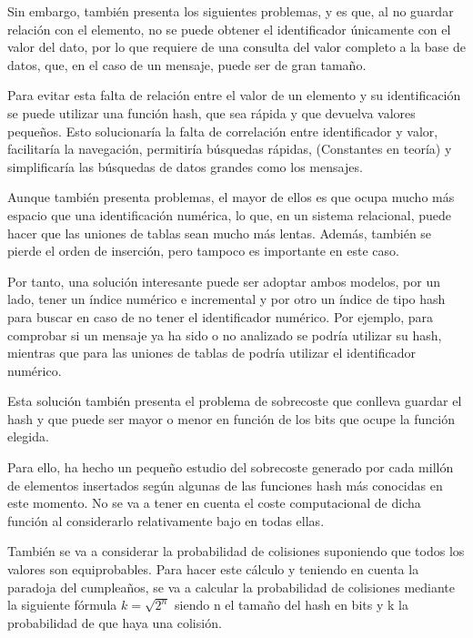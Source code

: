Sin embargo, también presenta los siguientes problemas, y es que, al no guardar relación con el elemento, no se puede obtener el identificador únicamente con el valor del dato, por lo que requiere de una consulta del valor completo a la base de datos, que, en el caso de un mensaje, puede ser de gran tamaño.

Para evitar esta falta de relación entre el valor de un elemento y su identificación se puede utilizar una función hash, que sea rápida y que devuelva valores pequeños. Esto solucionaría la falta de correlación entre identificador y valor, facilitaría la navegación, permitiría búsquedas rápidas, (Constantes en teoría) y simplificaría las búsquedas de datos grandes como los mensajes.

Aunque también presenta problemas, el mayor de ellos es que ocupa mucho más espacio que una identificación numérica, lo que, en un sistema relacional, puede hacer que las uniones de tablas sean mucho más lentas. Además, también se pierde el orden de inserción, pero tampoco es importante en este caso.

Por tanto, una solución interesante puede ser adoptar ambos modelos, por un lado, tener un índice numérico e incremental y por otro un índice de tipo hash para buscar en caso de no tener el identificador numérico. Por ejemplo, para comprobar si un mensaje ya ha sido o no analizado se podría utilizar su hash, mientras que para las uniones de tablas de podría utilizar el identificador numérico. 

Esta solución también presenta el problema de sobrecoste que conlleva guardar el hash y que puede ser mayor o menor en función de los bits que ocupe la función elegida.

Para ello, ha hecho un pequeño estudio del sobrecoste generado por cada millón de elementos insertados según algunas de las funciones hash más conocidas en este momento. No se va a tener en cuenta el coste computacional de dicha función al considerarlo relativamente bajo en todas ellas. 

También se va a considerar la probabilidad de colisiones suponiendo que todos los valores son equiprobables. Para hacer este cálculo y teniendo en cuenta la paradoja del cumpleaños, se va a calcular la probabilidad de colisiones mediante la siguiente fórmula \(k=\sqrt{2^n}\) siendo n el tamaño del hash en bits y k la probabilidad de que haya una colisión.


